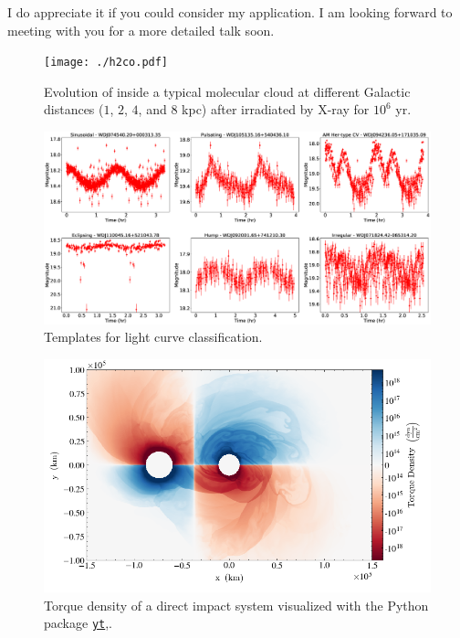 \documentclass[11pt, a4paper]{awesome-cv} %
\begin{document}
\begin{cvletter}
I do appreciate it if you could consider my application. I am looking forward to meeting with you for a more detailed talk soon.

\begin{figure}[h]
	\centering
	\texttt{[image: ./h2co.pdf]} 
	\caption{
		Evolution of  inside a typical molecular cloud at different Galactic distances ($1$, $2$, $4$, and $8$ kpc) after irradiated by X-ray for $10^6$ yr. 
	}
	\label{fig:1} 
\end{figure}
\begin{figure}[h]
	\centering
	\includegraphics[width=0.9\linewidth]{./Period_Class.eps} 
	\caption{
		Templates for light curve classification.
	}
	\label{fig:2} 
\end{figure}
\begin{figure} 
	\centering
	\includegraphics[width=0.9\linewidth]{./TorqueDensity.png} 
	\caption{
		Torque density of a direct impact system visualized with the Python package \href{https://yt-project.org}{\texttt{yt}},.
	}
	\label{fig:3} 
\end{figure}
 
\end{cvletter}


\end{document}
